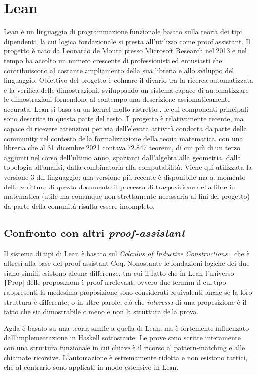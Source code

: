 \section{Lean}
Lean è un linguaggio di programmazione funzionale basato sulla teoria dei tipi dipendenti, la cui logica fondazionale si presta all'utilizzo come proof assistant. Il progetto è nato da Leonardo de Moura presso Microsoft Research nel 2013 e nel tempo ha accolto un numero crescente di professionisti ed entusiasti che contribuiscono al costante ampliamento della sua libreria e allo sviluppo del linguaggio. Obiettivo del progetto è colmare il divario tra la ricerca automatizzata e la verifica delle dimostrazioni, sviluppando un sistema capace di automatizzare le dimostrazioni fornendone al contempo una descrizione assiomaticamente accurata. Lean si basa su un kernel molto ristretto \cite{deMoura2015}, le cui componenti principali sono descritte in questa parte del testo. Il progetto è relativamente recente, ma capace di ricevere attenzioni per via dell'elevata attività condotta da parte della community nel contesto della formalizzazione della teoria matematica, con una libreria che al 31 dicembre 2021 contava 72.847 teoremi, di cui più di un terzo aggiunti nel corso dell'ultimo anno, spazianti dall'algebra alla geometria, dalla topologia all'analisi, dalla combinatoria alla computabilità.
Viene qui utilizzata la versione 3 del linguaggio: una versione più recente è disponibile \cite{10.1007/978-3-030-79876-5_37} ma al momento della scrittura di questo documento il processo di trasposizione della libreria matematica (utile ma comunque non strettamente necessaria ai fini del progetto) da parte della comunità risulta essere incompleto.

\subsection{Confronto con altri \emph{proof-assistant}}
Il sistema di tipi di Lean è basato sul \emph{Calculus of Inductive Constructions} \cite{coquand:inria-00076024}, che è altresì alla base del proof-assistant Coq. Nonostante le fondazioni logiche dei due siano simili, esistono alcune differenze, tra cui il fatto che in Lean l'universo \texttt|Prop| delle proposizioni è proof-irrelevant, ovvero due termini il cui tipo rappresenti la medesima proposizione sono considerati equivalenti anche se la loro struttura è differente, o in altre parole, ciò che \emph{interessa} di una proposizione è il fatto che sia dimostrabile o meno e non la struttura della prova.

Agda è basato su una teoria simile a quella di Lean, ma è fortemente influenzato dall'implementazione in Haskell sottostante. Le prove sono scritte interamente con una struttura funzionale in cui chiave è il ricorso al pattern-matching e alle chiamate ricorsive. L'automazione è estremamente ridotta e non esistono tattici, che al contrario sono applicati in modo estensivo in Lean.